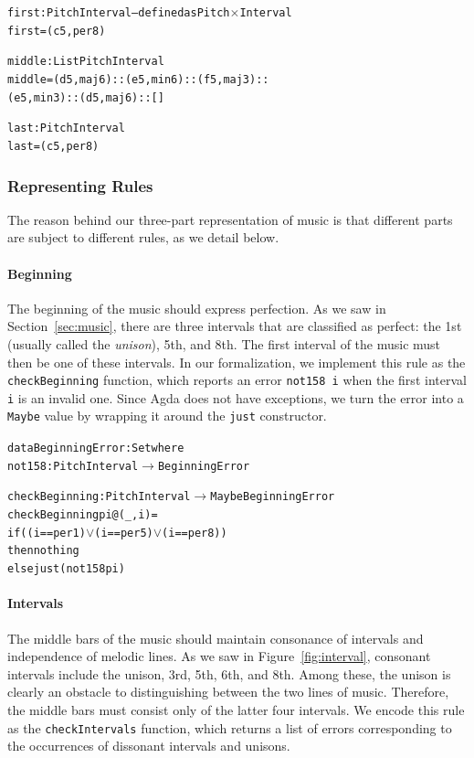 \begin{alltt}  
first : PitchInterval -- defined as Pitch \(\times\) Interval
first = (c 5 , per8)

middle : List PitchInterval
middle = (d 5 , maj6) :: (e 5 , min6) :: (f 5 , maj3) ::
         (e 5 , min3) :: (d 5 , maj6) :: []

last : PitchInterval
last = (c 5 , per8)
\end{alltt}

\subsubsection{Representing Rules}

The reason behind our three-part representation of music is that
different parts are subject to different rules, as we detail below.

\paragraph{Beginning}

The beginning of the music should express perfection.
As we saw in Section~\ref{sec:music}, there are three intervals that
are classified as perfect: the 1st (usually called the \emph{unison}),
5th, and 8th.
The first interval of the music must then be one of these intervals.
In our formalization, we implement this rule as the
\texttt{checkBeginning} function, which reports an error
\texttt{not158 i} when the first interval \texttt{i} is an invalid one.
Since Agda does not have exceptions, we turn the error into a
\texttt{Maybe} value by wrapping it around the \texttt{just} constructor.

\begin{alltt}
data BeginningError : Set where
  not158 : PitchInterval \(\rightarrow\) BeginningError
  
checkBeginning : PitchInterval \(\rightarrow\) Maybe BeginningError
checkBeginning pi@(_ , i) =
  if ((i == per1) \(\vee\) (i == per5) \(\vee\) (i == per8))
  then nothing
  else just (not158 pi)
\end{alltt}

\paragraph{Intervals}

The middle bars of the music should maintain consonance of intervals
and independence of melodic lines.
As we saw in Figure~\ref{fig:interval}, consonant intervals include
the unison, 3rd, 5th, 6th, and 8th.
Among these, the unison is clearly an obstacle to distinguishing
between the two lines of music.
Therefore, the middle bars must consist only of the latter four intervals.
We encode this rule as the \texttt{checkIntervals} function, which
returns a list of errors corresponding to the occurrences of dissonant
intervals and unisons.

